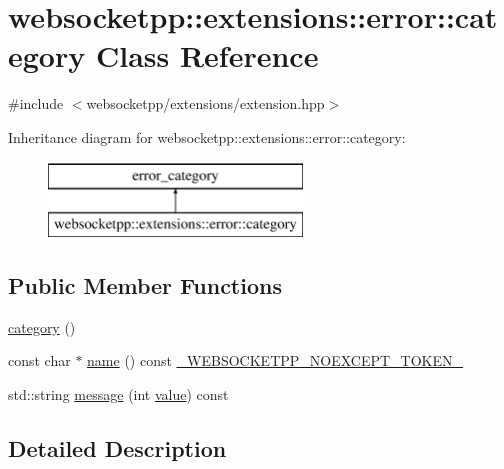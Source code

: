 \hypertarget{classwebsocketpp_1_1extensions_1_1error_1_1category}{}\section{websocketpp\+:\+:extensions\+:\+:error\+:\+:category Class Reference}
\label{classwebsocketpp_1_1extensions_1_1error_1_1category}


{\ttfamily \#include $<$websocketpp/extensions/extension.\+hpp$>$}

Inheritance diagram for websocketpp\+:\+:extensions\+:\+:error\+:\+:category\+:\begin{figure}[H]
\begin{center}
\leavevmode
\includegraphics[height=2.000000cm]{classwebsocketpp_1_1extensions_1_1error_1_1category}
\end{center}
\end{figure}
\subsection*{Public Member Functions}
\begin{DoxyCompactItemize}
\item 
\hyperlink{classwebsocketpp_1_1extensions_1_1error_1_1category_a044e36e73724d3245223225994e199dd}{category} ()
\item 
const char $\ast$ \hyperlink{classwebsocketpp_1_1extensions_1_1error_1_1category_a862ad7d1a031d6bcfee5f654425215fd}{name} () const \hyperlink{boost__config_8hpp_aa19747404a5f2fe9c9eb9e9d2e48f26c}{\+\_\+\+W\+E\+B\+S\+O\+C\+K\+E\+T\+P\+P\+\_\+\+N\+O\+E\+X\+C\+E\+P\+T\+\_\+\+T\+O\+K\+E\+N\+\_\+}
\item 
std\+::string \hyperlink{classwebsocketpp_1_1extensions_1_1error_1_1category_a0f7a2dc1baed8fe0ce972bccaef60f12}{message} (int \hyperlink{namespacewebsocketpp_1_1extensions_1_1error_a18c17e561b5a8e2dfc0d98437039f7bf}{value}) const 
\end{DoxyCompactItemize}


\subsection{Detailed Description}


